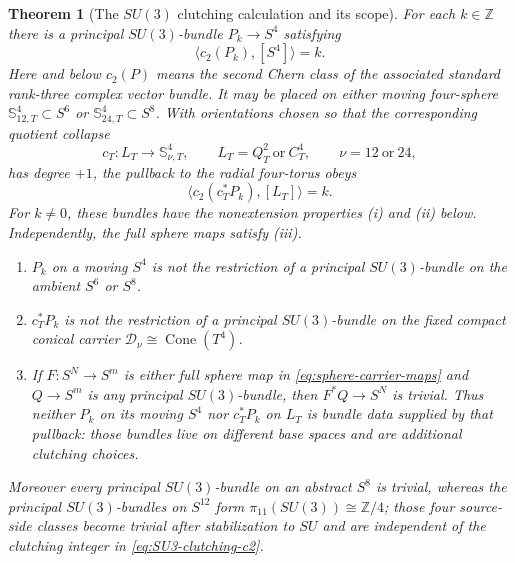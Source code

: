 \documentclass[11pt,letterpaper]{article}
\numberwithin{equation}{section}
\newtheorem{theorem}{Theorem}[section]
\theoremstyle{definition}
\theoremstyle{remark}
\newcommand{\Z}{\mathbb Z}
\newcommand{\Cone}{\operatorname{Cone}}
\begin{document}
\begin{theorem}[The \(SU(3)\) clutching calculation and its scope]
\label{thm:SU3-clutching-scope}
For each \(k\in\Z\) there is a principal \(SU(3)\)-bundle
\(P_k\to S^4\) satisfying
\begin{equation}
 \langle c_2(P_k),[S^4]\rangle=k.
 \label{eq:SU3-clutching-c2}
\end{equation}
Here and below \(c_2(P)\) means the second Chern class of the associated
standard rank-three complex vector bundle.
It may be placed on either moving four-sphere
\(\mathbb S_{12,T}^4\subset S^6\) or
\(\mathbb S_{24,T}^4\subset S^8\).  With orientations chosen so that the
corresponding quotient collapse
\[
 c_T:L_T\longrightarrow\mathbb S_{\nu,T}^4,
 \qquad
 L_T=Q_T^2\ \text{or}\ C_T^4,
 \qquad \nu=12\ \text{or}\ 24,
\]
has degree \(+1\), the pullback to the radial four-torus obeys
\begin{equation}
 \langle c_2(c_T^*P_k),[L_T]\rangle=k.
 \label{eq:radial-T4-clutching-c2}
\end{equation}
For \(k\ne0\), these bundles have the nonextension properties
\textup{(i)} and \textup{(ii)} below.  Independently, the full sphere maps
satisfy \textup{(iii)}.
\begin{enumerate}[label=\textup{(\roman*)}]
\item \(P_k\) on a moving \(S^4\) is not the restriction of a principal
\(SU(3)\)-bundle on the ambient \(S^6\) or \(S^8\).
\item \(c_T^*P_k\) is not the restriction of a principal \(SU(3)\)-bundle
on the fixed compact conical carrier
\(\mathcal D_\nu\cong\Cone(T^4)\).
\item If \(F:S^N\to S^m\) is either full sphere map in
\cref{eq:sphere-carrier-maps} and \(Q\to S^m\) is any principal
\(SU(3)\)-bundle, then \(F^*Q\to S^N\) is trivial.  Thus neither \(P_k\)
on its moving \(S^4\) nor \(c_T^*P_k\) on \(L_T\) is bundle data supplied
by that pullback: those bundles live on different base spaces and are
additional clutching choices.
\end{enumerate}
Moreover every principal \(SU(3)\)-bundle on an abstract \(S^8\) is
trivial, whereas the principal \(SU(3)\)-bundles on \(S^{12}\) form
\(\pi_{11}(SU(3))\cong\Z/4\); those four source-side classes become trivial
after stabilization to \(SU\) and are independent of the clutching integer
in \cref{eq:SU3-clutching-c2}.
\end{theorem}
\end{document}
